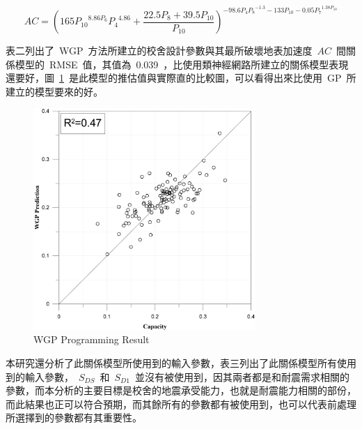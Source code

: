\begin{equation} AC = {({165 P_{10}}^{8.86 P_6} {P_4}^{4.86} + \dfrac{22.5 P_8 + 39.5 P_{10}}{P_{10}} )}^{-98.6 P_4{P_8}^{-1.3} - 133 P_{10} - 0.05 {P_7}^{1.38 P_{10}} }  \label{eq:WGP_AC}\end{equation}

表二列出了~WGP~方法所建立的校舍設計參數與其最所破壞地表加速度~$AC$~間關係模型的~RMSE~值，其值為~0.039~，比使用類神經網路所建立的關係模型表現還要好，圖~\ref{fig:WGP}~是此模型的推估值與實際直的比較圖，可以看得出來比使用~GP~所建立的模型要來的好。

\begin{figure}[hbtp]
  \begin{center}
    \includegraphics[width=0.75\textwidth]{figures/wgp.pdf}
    \caption{WGP Programming Result} 
    \label{fig:WGP}
  \end{center}
\end{figure}


本研究還分析了此關係模型所使用到的輸入參數，表三列出了此關係模型所有使用到的輸入參數，~$S_{DS}$~和~$S_{D1}$~並沒有被使用到，因其兩者都是和耐震需求相關的參數，而本分析的主要目標是校舍的地震承受能力，也就是耐震能力相關的部份，而此結果也正可以符合預期，而其餘所有的參數都有被使用到，也可以代表前處理所選擇到的參數都有其重要性。

